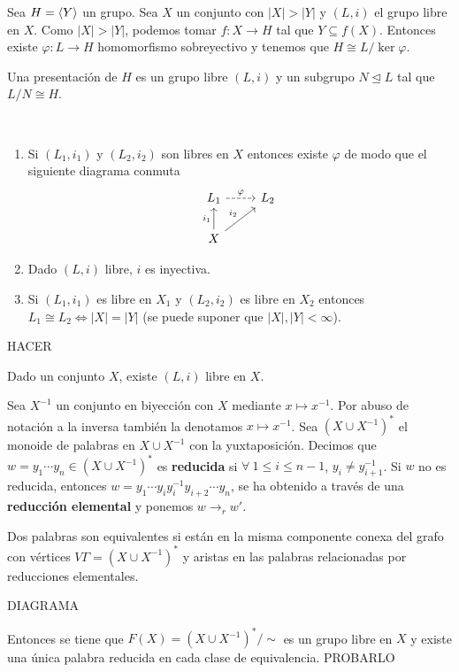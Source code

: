 \documentclass[twoside, 11pt]{article}
\begin{document}
\begin{observacion}
Sea $H=\langle{Y}\rangle$ un grupo. Sea $X$ un conjunto con $|X|>|Y|$ y $(L,i)$ el grupo libre en $X$. Como $|X|>|Y|$, podemos tomar $f:X\to H$ tal que $Y\subseteq f(X)$. Entonces existe $\varphi:L\to H$ homomorfismo sobreyectivo y tenemos que $H\cong L/\ker\varphi$.
\end{observacion}

\begin{defi}
Una presentación de $H$ es un grupo libre $(L,i)$ y un subgrupo $N\trianglelefteq L$ tal que $L/N\cong H$. 
\end{defi}

\begin{prop}\
\begin{enumerate}
\item Si $(L_1,i_1)$ y $(L_2,i_2)$ son libres en $X$ entonces existe $\varphi$ de modo que el siguiente diagrama conmuta
\[
\begin{tikzcd}
L_1\arrow[r, dashed,"\varphi"] & L_2\\
X\arrow[u, "i_1"]\arrow[ur, "i_2"]&
\end{tikzcd}
\]
\item Dado $(L,i)$ libre, $i$ es inyectiva. 
\item Si $(L_1,i_1)$ es libre en $X_1$ y $(L_2,i_2)$ es libre en $X_2$ entonces $L_1\cong L_2\Leftrightarrow |X|=|Y|$ (se puede suponer que $|X|,|Y|<\infty$).
\end{enumerate}
\end{prop}
\begin{dem}
HACER
\QED
\end{dem}

\begin{teorema}
Dado un conjunto $X$, existe $(L,i)$ libre en $X$.
\end{teorema}
\begin{dem}
Sea $X^{-1}$ un conjunto en biyección con $X$ mediante $x\mapsto x^{-1}$. Por abuso de notación a la inversa también la denotamos $x\mapsto x^{-1}$. Sea $(X\cup X^{-1})^*$ el monoide de palabras en $X\cup X^{-1}$ con la yuxtaposición. Decimos que $w=y_1\cdots y_n\in (X\cup X^{-1})^*$ es \textbf{reducida} si $\forall\ 1\leq i\leq n-1$, $y_i\neq y_{i+1}^{-1}$. Si $w$ no es reducida, entonces $w=y_1\cdots y_iy_i^{-1}y_{i+2}\cdots y_n$, se ha obtenido a través de una \textbf{reducción elemental} y ponemos $w\to_r w'$. 

Dos palabras son equivalentes si están en la misma componente conexa del grafo con vértices $V\Gamma=(X\cup X^{-1})^*$ y aristas en las palabras relacionadas por reducciones elementales. 

DIAGRAMA

Entonces se tiene que $F(X)=(X\cup X^{-1})^*/\sim$ es un grupo libre en $X$ y existe una única palabra reducida en cada clase de equivalencia. PROBARLO 

\QED
\end{dem}
\end{document}
